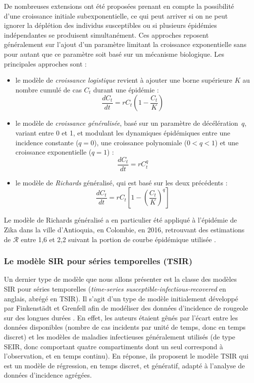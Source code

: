 De nombreuses extensions ont été proposées prenant en compte la possibilité d'une croissance initiale subexponentielle, ce qui peut arriver si on ne peut ignorer la déplétion des individus susceptibles ou si plusieurs épidémies indépendantes se produisent simultanément.
Ces approches reposent généralement sur l'ajout d'un paramètre limitant la croissance exponentielle sans pour autant que ce paramètre soit basé sur un mécanisme biologique.
Les principales approches sont :
\begin{itemize}
\item le modèle de {\em croissance logistique} revient à ajouter une borne supérieure $K$ au nombre cumulé de cas $C_t$ durant une épidémie :
\begin{equation}
\frac{dC_t}{dt} = r C_t\left(1-\frac{C_t}{K} \right)
\end{equation}
\item le modèle de {\em croissance généralisée}, basé sur un paramètre de \guillemotleft décélération\guillemotright\ $q$, variant entre 0 et 1, et modulant les dynamiques épidémiques entre une incidence constante ($q=0$), une croissance polynomiale ($0<q<1$) et une croissance exponentielle ($q=1$) \cite{viboud2016generalized} :
\begin{equation}
\frac{dC_t}{dt} = r C_t^q
\end{equation}
\item le modèle de {\em Richards} généralisé, qui est basé sur les deux précédents \cite{ma2014estimating} :
\begin{equation}
\frac{dC_t}{dt} = r C_t\left[1- \left(\frac{C_t}{K}\right)^q \right]
\end{equation}

\end{itemize}
Le modèle de Richards généralisé a en particulier été appliqué à l'épidémie de Zika dans la ville d'Antioquia, en Colombie, en 2016, retrouvant des estimations de $\mathcal{R}$ entre 1,6 et 2,2 suivant la portion de courbe épidémique utilisée  \cite{chowell_using_2016}.


\subsubsection{Le modèle SIR pour séries temporelles (TSIR)}
\label{sec:tsir}

Un dernier type de modèle que nous allons présenter est la classe des modèles SIR pour séries temporelles ({\em time-series susceptible-infectious-recovered} en anglais, abrégé en TSIR).
Il s'agit d'un type de modèle initialement développé par Finkenstädt et Grenfell afin de modéliser des données d'incidence de rougeole sur des longues durées \cite{finkenstadt2000time}.
En effet, les auteurs étaient gênés par l'écart entre les données disponibles (nombre de cas incidents par unité de temps, donc en temps discret) et les modèles de maladies infectieuses généralement utilisés (de type SEIR, donc comportant quatre compartiments dont un seul correspond à l'observation, et en temps continu).
En réponse, ils proposent le modèle TSIR qui est un modèle de régression, en temps discret, et génératif, adapté à l'analyse de données d'incidence agrégées.

